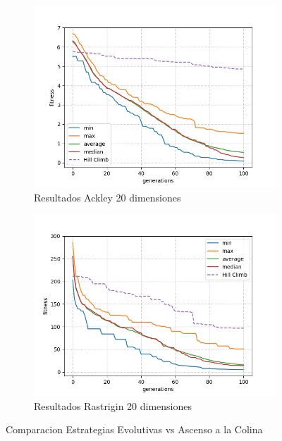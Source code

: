 \documentclass[twocolumn]{IEEEtran}
\begin{document}
\begin{figure}[htpb!]
    \centering
    \begin{subfigure}[htpb!]{1\linewidth}
        \includegraphics[width=\linewidth]{figures/es_ackley20.png}
        \caption{Resultados Ackley 20 dimensiones}
    \end{subfigure}
    \begin{subfigure}[htpb!]{1\linewidth}
        \includegraphics[width=\linewidth]{figures/es_rastrigin20.png}
        \caption{Resultados Rastrigin 20 dimensiones}
    \end{subfigure}
    \caption{Comparacion Estrategias Evolutivas vs Ascenso a la Colina}
    \label{figure:result_hc}
\end{figure}
\end{document}

